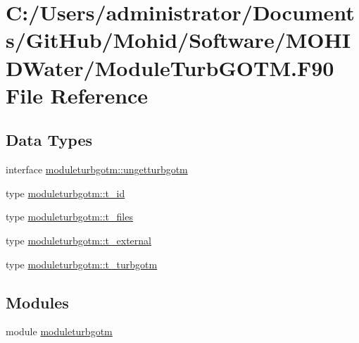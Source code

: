 \hypertarget{_module_turb_g_o_t_m_8_f90}{}\section{C\+:/\+Users/administrator/\+Documents/\+Git\+Hub/\+Mohid/\+Software/\+M\+O\+H\+I\+D\+Water/\+Module\+Turb\+G\+O\+TM.F90 File Reference}
\label{_module_turb_g_o_t_m_8_f90}
\subsection*{Data Types}
\begin{DoxyCompactItemize}
\item 
interface \mbox{\hyperlink{interfacemoduleturbgotm_1_1ungetturbgotm}{moduleturbgotm\+::ungetturbgotm}}
\item 
type \mbox{\hyperlink{structmoduleturbgotm_1_1t__id}{moduleturbgotm\+::t\+\_\+id}}
\item 
type \mbox{\hyperlink{structmoduleturbgotm_1_1t__files}{moduleturbgotm\+::t\+\_\+files}}
\item 
type \mbox{\hyperlink{structmoduleturbgotm_1_1t__external}{moduleturbgotm\+::t\+\_\+external}}
\item 
type \mbox{\hyperlink{structmoduleturbgotm_1_1t__turbgotm}{moduleturbgotm\+::t\+\_\+turbgotm}}
\end{DoxyCompactItemize}
\subsection*{Modules}
\begin{DoxyCompactItemize}
\item 
module \mbox{\hyperlink{namespacemoduleturbgotm}{moduleturbgotm}}
\end{DoxyCompactItemize}
